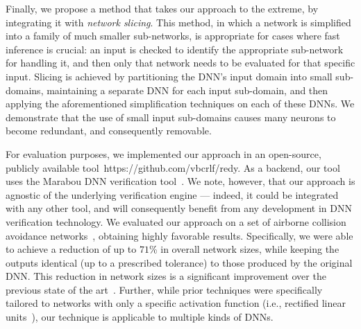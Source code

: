 \documentclass[10pt, conference, twocolumn, compsocconf]{IEEEtran}
\theoremstyle{remark}
\begin{document}


Finally, we propose a method that takes our approach to the extreme,
by integrating it with \emph{network slicing}. This method, in which a
network is simplified into a family of much smaller sub-networks, is
appropriate for cases where fast inference is crucial: an input is
checked to identify the appropriate sub-network for handling it, and
then only that network needs to be evaluated for that specific input.
Slicing is achieved by partitioning the DNN's input
domain into small sub-domains, maintaining a separate DNN for each
input sub-domain, and then applying the aforementioned simplification
techniques on each of these DNNs. We demonstrate that the use of 
small input sub-domains causes many neurons to become redundant, and
consequently removable.


For evaluation purposes, we implemented our approach in an
open-source, publicly available tool~https://github.com/vbcrlf/redy. As a
backend, our tool uses the Marabou DNN verification
tool~\cite{Marabou2019}. We note, however, that our approach is
agnostic of the underlying verification engine --- indeed, it could be
integrated with any other tool, and will consequently benefit from any
development in DNN verification technology.  We evaluated our approach
on a set of airborne collision avoidance networks~\cite{JuLoBrOwKo16},
obtaining highly favorable results. Specifically, we were able to
achieve a reduction of up to $71$\% in overall network sizes, while
keeping the outputs identical (up to a prescribed tolerance) to those
produced by the original DNN.  This reduction in network sizes is a
significant improvement over the previous state of the
art~\cite{GoFeMaBaKa20}. Further, while prior techniques were
specifically tailored to networks with only a specific activation
function (i.e., rectified linear units~\cite{GoFeMaBaKa20}), our
technique is applicable to multiple kinds of DNNs.
\end{document}
